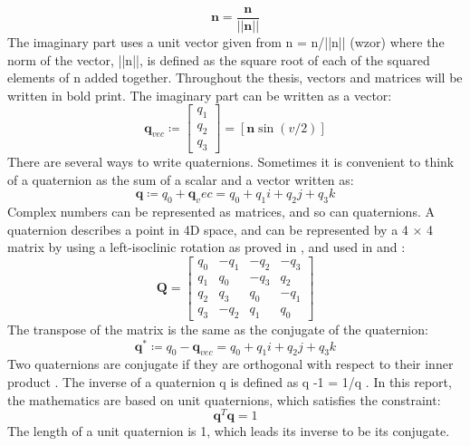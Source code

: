 \documentclass[12pt,a4paper,oneside]{article}
\begin{document}
\begin{equation}
\bm{n} = \frac{\bm{n}}{||\bm{n}||}
\end{equation}
The imaginary part uses a unit vector given from n = n/||n|| (wzor)
where the norm of the vector, ||n||, is defined as the square root of each of the squared elements of n added together.
Throughout the thesis, vectors and matrices will be written in bold print.
The imaginary part can be written as a vector:
\begin{equation}
\bm{q}_{vec} \coloneqq \begin{bmatrix}
q_1 \\
q_2 \\
q_3
\end{bmatrix}
= [\bm{n}\sin(v/2)]
\end{equation}
There are several ways to write quaternions. Sometimes it is convenient to think of a quaternion as the sum of a scalar and a vector written as:
\begin{equation}
\bm{q} \coloneqq q_0 + \bm{q}_vec = q_0 + q_1i + q_2j+ q_3k
\end{equation}
Complex numbers can be represented as matrices, and so can quaternions. A quaternion describes a point in 4D space, and can be represented by a 4 × 4 matrix by using a left-isoclinic rotation as proved in \citet{mebius2005matrix}, and used in \citet{mathworldconjugate} and \citet{shoemake1985animating}:
\begin{equation}
\bm{Q} = \begin{bmatrix}
q_0 & -q_1 & -q_2 & -q_3 \\
q_1 & q_0 & -q_3 & q_2 \\
q_2 & q_3 & q_0 & -q_1 \\
q_3 & -q_2 & q_1 & q_0
\end{bmatrix}
\end{equation}
The transpose of the matrix is the same as the conjugate of the quaternion:
\begin{equation}
\bm{q}^* \coloneqq q_0 - \bm{q}_{vec} = q_0 + q_1i + q_2j+ q_3k
\end{equation}
Two quaternions are conjugate if they are orthogonal with respect to their inner product \citet{horn1987closed}. The inverse of a quaternion q is defined as q -1 = 1/q . In this report, the mathematics
are based on unit quaternions, which satisfies the constraint:
\begin{equation}
\bm{q}^T\bm{q} = 1
\end{equation}
The length of a unit quaternion is 1, which leads its inverse to be its conjugate.
\end{document}
